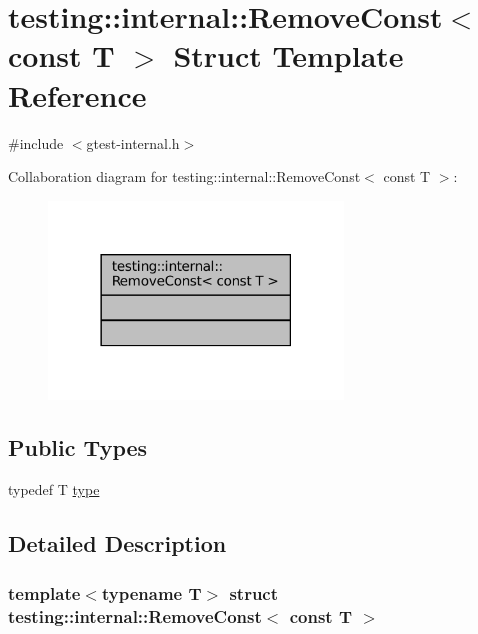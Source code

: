 \hypertarget{structtesting_1_1internal_1_1RemoveConst_3_01const_01T_01_4}{}\section{testing\+:\+:internal\+:\+:Remove\+Const$<$ const T $>$ Struct Template Reference}
\label{structtesting_1_1internal_1_1RemoveConst_3_01const_01T_01_4}


{\ttfamily \#include $<$gtest-\/internal.\+h$>$}



Collaboration diagram for testing\+:\+:internal\+:\+:Remove\+Const$<$ const T $>$\+:
\nopagebreak
\begin{figure}[H]
\begin{center}
\leavevmode
\includegraphics[width=222pt]{structtesting_1_1internal_1_1RemoveConst_3_01const_01T_01_4__coll__graph}
\end{center}
\end{figure}
\subsection*{Public Types}
\begin{DoxyCompactItemize}
\item 
typedef T \hyperlink{structtesting_1_1internal_1_1RemoveConst_3_01const_01T_01_4_ac88c6824d228ab05091e5a4f1c1a95fc}{type}
\end{DoxyCompactItemize}


\subsection{Detailed Description}
\subsubsection*{template$<$typename T$>$\newline
struct testing\+::internal\+::\+Remove\+Const$<$ const T $>$}



